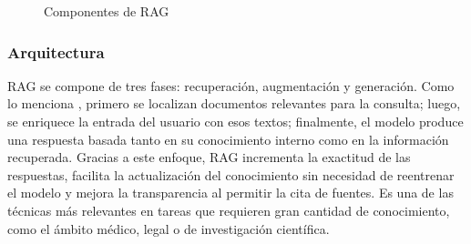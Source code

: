 \begin{figure}[H]
\begin{center}
\end{center}
\caption{Componentes de RAG}
\label{fig:arquitectura_rag}
\end{figure}

\subsubsection{Arquitectura}

RAG se compone de tres fases: recuperación, augmentación y generación. Como lo menciona \textcite{gao2023rag}, primero se 
localizan documentos relevantes para la consulta; luego, se enriquece la entrada del usuario con esos textos; finalmente, el modelo produce 
una respuesta basada tanto en su conocimiento interno como en la información recuperada. Gracias a este enfoque, RAG incrementa la exactitud 
de las respuestas, facilita la actualización del conocimiento sin necesidad de reentrenar el modelo y mejora la transparencia al permitir la 
cita de fuentes. Es una de las técnicas más relevantes en tareas que requieren gran 
cantidad de conocimiento, como el ámbito médico, legal o de investigación científica.  



